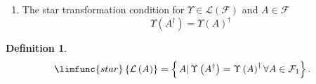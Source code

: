 \documentclass[aps,preprint]{revtex4}
\newtheorem{definition}[theorem]{Definition}
\begin{document}
\begin{enumerate}
\begin{enumerate}
\item The invariance group $G_{CAR}$ of the CAR in this form is 
\begin{equation}
T^{t}\left( 
\begin{array}{cc}
\left\{ \boldsymbol{x}_{1},\boldsymbol{x}_{1}\right\} & \left\{ \boldsymbol{x%
}_{1},\boldsymbol{x}_{2}\right\} \\ 
\left\{ \boldsymbol{x}_{2},\boldsymbol{x}_{1}\right\} & \left\{ \boldsymbol{x%
}_{2},\boldsymbol{x}_{2}\right\}%
\end{array}%
\right) T=T^{t}\left( \left( 
\begin{array}{c}
\boldsymbol{x}_{1} \\ 
\boldsymbol{x}_{2}%
\end{array}%
\right) \left( 
\begin{array}{cc}
\boldsymbol{x}_{1} & \boldsymbol{x}_{2}%
\end{array}%
\right) +\left( 
\begin{array}{cc}
\boldsymbol{x}_{1} & \boldsymbol{x}_{2}%
\end{array}%
\right) \left( 
\begin{array}{c}
\boldsymbol{x}_{1} \\ 
\boldsymbol{x}_{2}%
\end{array}%
\right) \right) T=T^{t}\frac{1}{2}\left( 
\begin{array}{cc}
I_{r} & 0_{r} \\ 
0_{r} & I_{r}%
\end{array}%
\right) T=\frac{1}{2}\left( 
\begin{array}{cc}
I_{r} & 0_{r} \\ 
0_{r} & I_{r}%
\end{array}%
\right) ,
\end{equation}%
for $T\in GL\left( 2r,\mathbb{C}\right) $ again showing 
\begin{equation}
G_{CAR}\cong O\left( 2r,\mathbb{C}\right) .
\end{equation}
\end{enumerate}

\item The star transformation condition for $\Upsilon \in \mathcal{L}\left( 
\mathcal{F}\right) $ and $A\in \mathcal{F}$%
\begin{equation}
\Upsilon \left( A^{\dagger }\right) =\Upsilon \left( A\right) ^{\dagger }
\end{equation}
\end{enumerate}

\begin{definition}
\begin{equation}
\limfunc{star}\left\{ \mathcal{L}\left( A\right) \right\} =\left\{ \left.
A\right\vert \Upsilon \left( A^{\dagger }\right) =\Upsilon \left( A\right)
^{\dagger }\forall A\in \mathcal{F}_{1}\right\} .
\end{equation}
\end{definition}
\end{document}
